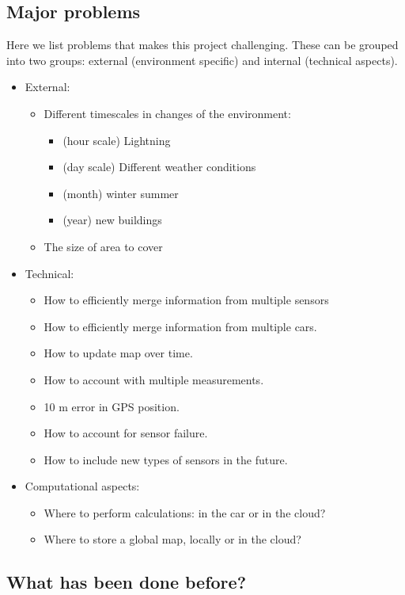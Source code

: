 \subsection{Major problems}
Here we list problems that makes this project challenging. These can
be grouped into two groups: external (environment specific) and
internal (technical aspects).
\begin{itemize}
\item External:
  \begin{itemize}
  \item Different timescales in changes of the environment:
    \begin{itemize}
    \item (hour scale) Lightning
    \item (day scale) Different weather conditions
    \item (month) winter summer
    \item (year) new buildings
    \end{itemize}
  \item The size of area to cover
  \end{itemize}
\item Technical:
  \begin{itemize}
  \item  How to efficiently merge information from multiple
    sensors
  \item  How to efficiently merge information from multiple cars.
  \item  How to update map over time.
  \item How to account with multiple measurements.
  \item  10 m error in GPS position.
  \item  How to account for sensor failure.
  \item  How to include new types of sensors in the future.
  \end{itemize}
\item  Computational aspects:
  \begin{itemize}
  \item   Where to perform calculations: in the car or in the
    cloud?
  \item   Where to store a global map, locally or in the cloud?
 \end{itemize}
\end{itemize}


\subsection{What has been done before?}

